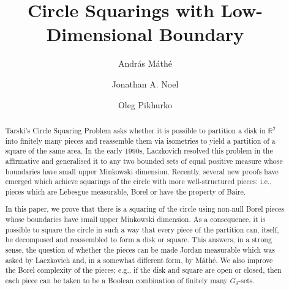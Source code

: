 \documentclass[12pt,a4paper]{amsart}
\title{Circle Squarings with Low-Dimensional Boundary}
\author{Andr\'{a}s M\'{a}th\'{e} \and Jonathan A. Noel \and Oleg Pikhurko}
\numberwithin{equation}{section}
\theoremstyle{definition}
\begin{document}

\newcommand{\boxdim}{\operatorname{dim}_\square}
\newcommand{\dist}{\operatorname{dist}}
\newcommand{\diam}{\operatorname{diam}}
\renewcommand{\deg}{\operatorname{deg}}
\newcommand{\lex}{\prec_{\operatorname{lex}}}
\newcommand{\eps}{\varepsilon} 
\newcommand{\simTr}{\overset{{\mbox{\tiny Tr}}}{\sim}}
\newcommand{\ind}{\mathbbm{1}}
\newcommand{\induced}{\upharpoonright}
\newcommand{\cl}{\operatorname{cl}}
\newcommand{\interior}{\operatorname{int}}
\newcommand{\vvec}{\boldsymbol}
\newcommand{\fillS}{\operatorname{fill}}
\newcommand{\comp}{\operatorname{comp}}
\newcommand{\holes}{\operatorname{holes}}
\newcommand{\fout}[1]{#1^{\operatorname{out}}}
\newcommand{\fin}[1]{{#1}_{\operatorname{in}}}







\begin{abstract}
Tarski's Circle Squaring Problem asks whether it is possible to partition a disk in $\mathbb{R}^2$ into finitely many pieces and reassemble them via isometries to yield a partition of a square of the same area. In the early 1990s, Laczkovich resolved this problem in the affirmative and generalised it to any two bounded sets of equal positive measure whose boundaries have small upper Minkowski dimension. Recently, several new proofs have emerged which achieve squarings of the circle with more well-structured pieces: i.e., pieces which are Lebesgue measurable, Borel or have the property of Baire. 

In this paper, we prove that there is a squaring of the circle using non-null Borel pieces whose boundaries have small upper Minkowski dimension. As a consequence, it is possible to square the circle in such a way that every piece of the partition can, itself, be decomposed and reassembled to form a disk or square. This answers, in a strong sense, the question of whether the pieces can be made Jordan measurable which was asked by Laczkovich and, in a somewhat different form, by M\'ath\'e. We also improve the Borel complexity of the pieces; e.g., if the disk and square are open or closed, then each piece can be taken to be a Boolean combination of finitely many $G_\delta$-sets.
\end{abstract}
\end{document}
